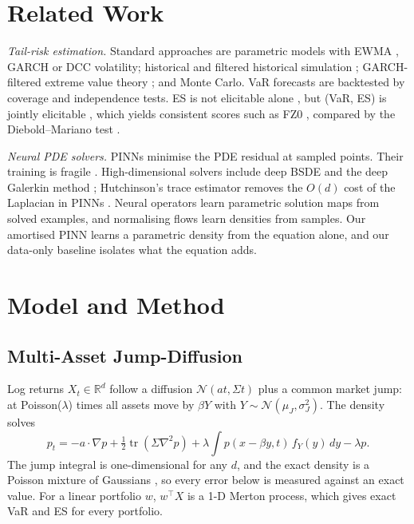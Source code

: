 \documentclass[conference]{IEEEtran}
\begin{document}
\section{Related Work}

\emph{Tail-risk estimation.} Standard approaches are parametric models with EWMA \cite{riskmetrics1996}, GARCH
\cite{bollerslev1986} or DCC \cite{engle2002} volatility; historical and filtered historical simulation
\cite{barone1999}; GARCH-filtered extreme value theory \cite{mcneil2000}; and Monte Carlo. VaR forecasts are
backtested by coverage \cite{kupiec1995} and independence \cite{christoffersen1998} tests. ES is not elicitable
alone \cite{gneiting2011}, but (VaR, ES) is jointly elicitable \cite{fissler2016}, which yields consistent scores
such as FZ0 \cite{patton2019}, compared by the Diebold--Mariano test \cite{diebold1995}.

\emph{Neural PDE solvers.} PINNs \cite{lagaris1998,raissi2019} minimise the PDE residual at sampled points.
Their training is fragile \cite{wang2021,krishnapriyan2021}. High-dimensional solvers include deep BSDE
\cite{han2018} and the deep Galerkin method \cite{sirignano2018}; Hutchinson's trace estimator
\cite{hutchinson1989} removes the $O(d)$ cost of the Laplacian in PINNs \cite{hu2024}. Neural operators
\cite{lu2021,li2021} learn parametric solution maps from solved examples, and normalising flows
\cite{papamakarios2021} learn densities from samples. Our amortised PINN learns a parametric density from the
equation alone, and our data-only baseline isolates what the equation adds.

\section{Model and Method}

\subsection{Multi-Asset Jump-Diffusion}
Log returns $X_t \in \mathbb{R}^d$ follow a diffusion $\mathcal{N}(at, \Sigma t)$ plus a common market jump: at
Poisson($\lambda$) times all assets move by $\beta Y$ with $Y \sim \mathcal{N}(\mu_J, \sigma_J^2)$. The density
solves
\begin{equation}
  p_t = -a\cdot\nabla p + \tfrac12\operatorname{tr}(\Sigma\nabla^2 p)
        + \lambda\!\int\! p(x-\beta y,t)\,f_Y(y)\,dy - \lambda p .
  \label{eq:pide}
\end{equation}
The jump integral is one-dimensional for any $d$, and the exact density is a Poisson mixture of Gaussians
\cite{merton1976}, so every error below is measured against an exact value. For a linear portfolio $w$,
$w^\top X$ is a 1-D Merton process, which gives exact VaR and ES for every portfolio.
\end{document}
